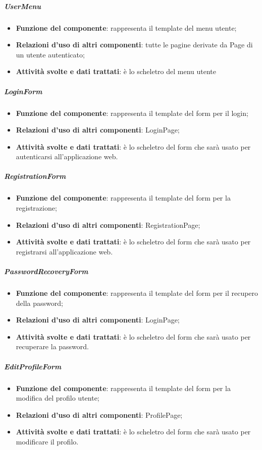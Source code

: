 \subparagraph{UserMenu}
\begin{itemize}
	\item \textbf{Funzione del componente}: rappresenta il template del menu utente;
	\item \textbf{Relazioni d’uso di altri componenti}: tutte le pagine derivate da Page di un utente autenticato;
	\item \textbf{Attività svolte e dati trattati}: \`{e} lo scheletro del menu utente
\end{itemize}

\subparagraph{LoginForm}
\begin{itemize}
	\item \textbf{Funzione del componente}: rappresenta il template del form per il login;
	\item \textbf{Relazioni d’uso di altri componenti}: LoginPage;
	\item \textbf{Attività svolte e dati trattati}: \`{e} lo scheletro del form che sar\`{a} usato per autenticarsi all'applicazione web.
\end{itemize}

\subparagraph{RegistrationForm}
\begin{itemize}
	\item \textbf{Funzione del componente}: rappresenta il template del form per la registrazione;
	\item \textbf{Relazioni d’uso di altri componenti}: RegistrationPage;
	\item \textbf{Attività svolte e dati trattati}: \`{e} lo scheletro del form che sar\`{a} usato per registrarsi all'applicazione web.
\end{itemize}

\subparagraph{PasswordRecoveryForm}
\begin{itemize}
	\item \textbf{Funzione del componente}: rappresenta il template del form per il recupero della password;
	\item \textbf{Relazioni d’uso di altri componenti}: LoginPage;
	\item \textbf{Attività svolte e dati trattati}: \`{e} lo scheletro del form che sar\`{a} usato per recuperare la password.
\end{itemize}

\subparagraph{EditProfileForm}
\begin{itemize}
	\item \textbf{Funzione del componente}: rappresenta il template del form per la modifica del profilo utente;
	\item \textbf{Relazioni d’uso di altri componenti}: ProfilePage;
	\item \textbf{Attività svolte e dati trattati}: \`{e} lo scheletro del form che sar\`{a} usato per modificare il profilo.
\end{itemize}

